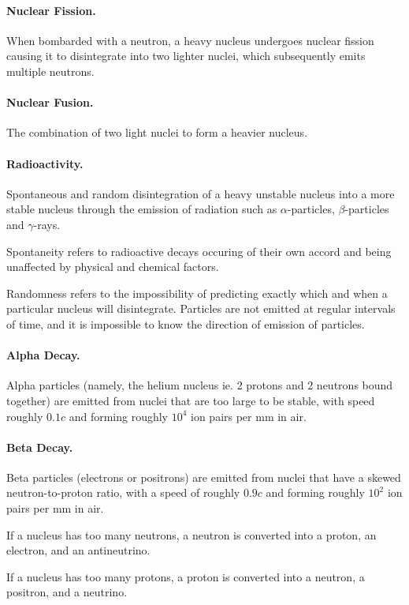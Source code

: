 \documentclass{article}
\begin{document}
\paragraph{Nuclear Fission.} When bombarded with a neutron, a heavy nucleus
undergoes nuclear fission causing it to disintegrate into two lighter nuclei,
which subsequently emits multiple neutrons.

\paragraph{Nuclear Fusion.} The combination of two light nuclei to form a
heavier nucleus.

\paragraph{Radioactivity.} Spontaneous and random disintegration of a heavy
unstable nucleus into a more stable nucleus through the emission of radiation
such as $\alpha$-particles, $\beta$-particles and $\gamma$-rays.

Spontaneity refers to radioactive decays occuring of their own accord and being
unaffected by physical and chemical factors.

Randomness refers to the impossibility of predicting exactly which and when a
particular nucleus will disintegrate. Particles are not emitted at regular
intervals of time, and it is impossible to know the direction of emission of
particles.

\paragraph{Alpha Decay.} Alpha particles (namely, the helium nucleus ie. 2
protons and 2 neutrons bound together) are emitted from nuclei that are too
large to be stable, with speed roughly $0.1c$ and forming roughly $10^4$ ion
pairs per mm in air.

\paragraph{Beta Decay.} Beta particles (electrons or positrons) are emitted from
nuclei that have a skewed neutron-to-proton ratio, with a speed of roughly
$0.9c$ and forming roughly $10^2$ ion pairs per mm in air.

If a nucleus has too many neutrons, a neutron is converted into a proton, an
electron, and an antineutrino.

If a nucleus has too many protons, a proton is converted into a neutron, a
positron, and a neutrino.
\end{document}
